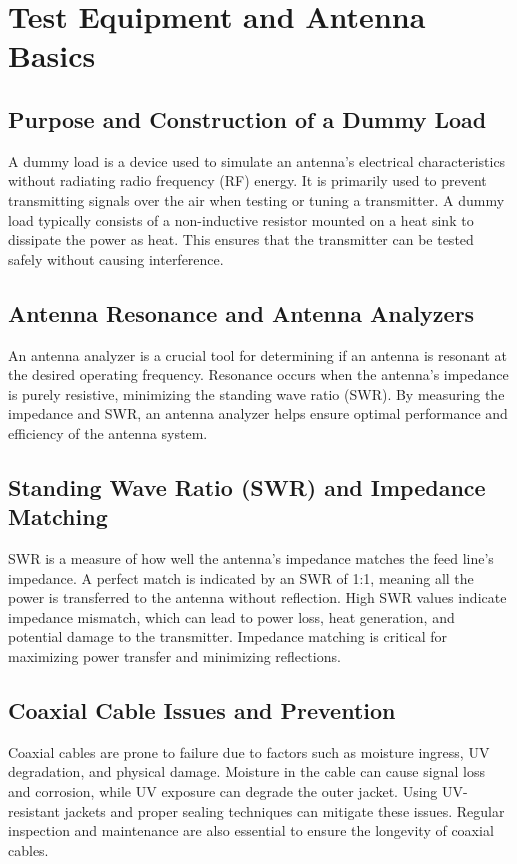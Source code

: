 \section{Test Equipment and Antenna Basics}
\label{section:test_equipment_antenna_basics}

\subsection*{Purpose and Construction of a Dummy Load}
A dummy load is a device used to simulate an antenna's electrical characteristics without radiating radio frequency (RF) energy. It is primarily used to prevent transmitting signals over the air when testing or tuning a transmitter. A dummy load typically consists of a non-inductive resistor mounted on a heat sink to dissipate the power as heat. This ensures that the transmitter can be tested safely without causing interference.

\subsection*{Antenna Resonance and Antenna Analyzers}
An antenna analyzer is a crucial tool for determining if an antenna is resonant at the desired operating frequency. Resonance occurs when the antenna's impedance is purely resistive, minimizing the standing wave ratio (SWR). By measuring the impedance and SWR, an antenna analyzer helps ensure optimal performance and efficiency of the antenna system.

\subsection*{Standing Wave Ratio (SWR) and Impedance Matching}
SWR is a measure of how well the antenna's impedance matches the feed line's impedance. A perfect match is indicated by an SWR of 1:1, meaning all the power is transferred to the antenna without reflection. High SWR values indicate impedance mismatch, which can lead to power loss, heat generation, and potential damage to the transmitter. Impedance matching is critical for maximizing power transfer and minimizing reflections.

\subsection*{Coaxial Cable Issues and Prevention}
Coaxial cables are prone to failure due to factors such as moisture ingress, UV degradation, and physical damage. Moisture in the cable can cause signal loss and corrosion, while UV exposure can degrade the outer jacket. Using UV-resistant jackets and proper sealing techniques can mitigate these issues. Regular inspection and maintenance are also essential to ensure the longevity of coaxial cables.


